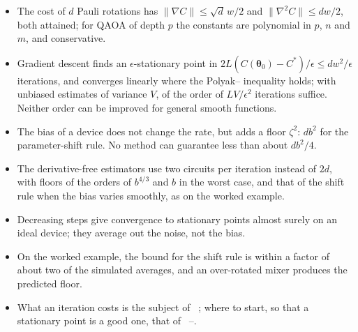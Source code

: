 \documentclass[handoutsbeamer.tex]{subfiles}
\begin{document}
\begin{frame}
\onp{\footnotesize}
\begin{itemize}\setlength\itemsep{0.25em}
    \item The cost of $d$ Pauli rotations has $\|\nabla C\|\le\sqrt d\,w/2$ and $\|\nabla^2C\|\le dw/2$, both attained; for QAOA of depth $p$ the constants are polynomial in $p$, $n$ and $m$, and conservative.
    \item Gradient descent finds an $\epsilon$-stationary point in $2L(C(\boldsymbol\theta_0)-C^*)/\epsilon\le dw^2/\epsilon$ iterations, and converges linearly where the Polyak--\Loj{} inequality holds; with unbiased estimates of variance $V$, of the order of $LV/\epsilon^2$ iterations suffice. Neither order can be improved for general smooth functions.
    \item The bias of a device does not change the rate, but adds a floor $\zeta^2$: $db^2$ for the parameter-shift rule. No method can guarantee less than about $db^2/4$.
    \item The derivative-free estimators use two circuits per iteration instead of $2d$, with floors of the orders of $b^{4/3}$ and $b$ in the worst case, and that of the shift rule when the bias varies smoothly, as on the worked example.
    \item Decreasing steps give convergence to stationary points almost surely on an ideal device; they average out the noise, not the bias.
    \item On the worked example, the bound for the shift rule is within a factor of about two of the simulated averages, and an over-rotated mixer produces the predicted floor.
    \item What an iteration costs is the subject of \Chap~; where to start, so that a stationary point is a good one, that of \Chaps~--.
\end{itemize}
\end{frame}

\end{document}
